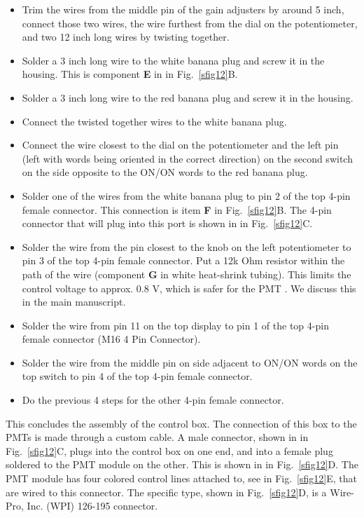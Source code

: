 \documentclass[10pt,letterpaper]{article}
\begin{document}
\begin{itemize}
    \item Trim the wires from the middle pin of the gain adjusters by around 5 inch, connect those two wires, the wire furthest from the dial on the potentiometer, and two 12 inch long wires by twisting together.
    \item Solder a 3 inch long wire to the white banana plug and screw it in the housing. This is component \textbf{E} in in Fig.~\ref{sfig12}B.
    \item Solder a 3 inch long wire to the red banana plug and screw it in the housing.
    \item Connect the twisted together wires to the white banana plug.
    \item Connect the wire closest to the dial on the potentiometer and the left pin (left with words being oriented in the correct direction) on the second switch on the side opposite to the ON/ON words to the red banana plug.
    \item Solder one of the wires from the white banana plug to pin 2 of the top 4-pin female connector. This connection is item \textbf{F} in Fig.~\ref{sfig12}B. The 4-pin connector that will plug into this port is shown in in Fig.~\ref{sfig12}C.
    \item Solder the wire from the pin closest to the knob on the left potentiometer to pin 3 of the top 4-pin female connector. Put a 12k Ohm resistor within the path of the wire (component \textbf{G} in white heat-shrink tubing). This limits the control voltage to approx. 0.8 V, which is safer for the PMT \cite{Hamamatsu2024}. We discuss this in the main manuscript.
    \item Solder the wire from pin 11 on the top display to pin 1 of the top 4-pin female connector (M16 4 Pin Connector).
    \item Solder the wire from the middle pin on side adjacent to ON/ON words on the top switch to pin 4 of the top 4-pin female connector.
    \item Do the previous 4 steps for the other 4-pin female connector.
\end{itemize}
%
This concludes the assembly of the control box. The connection of this box to the PMTs is made through a custom cable. A male connector, shown in in Fig.~\ref{sfig12}C, plugs into the control box on one end, and into a female plug soldered to the PMT module on the other. This is shown in in Fig.~\ref{sfig12}D. The PMT module has four colored control lines attached to, see in Fig.~\ref{sfig12}E, that are wired to this connector. The specific type, shown in Fig.~\ref{sfig12}D, is a Wire-Pro, Inc. (WPI) 126-195 connector.
\end{document}
